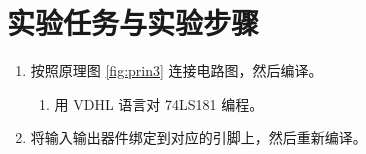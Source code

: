 \section{实验任务与实验步骤}

\begin{enumerate}
    \item 按照原理图 \ref{fig:prin3} 连接电路图，然后编译。
    
    \begin{enumerate}
        \item 用 VDHL 语言对 74LS181 编程。
        
                
    \end{enumerate}
    
    \item 将输入输出器件绑定到对应的引脚上，然后重新编译。
    

\end{enumerate}
